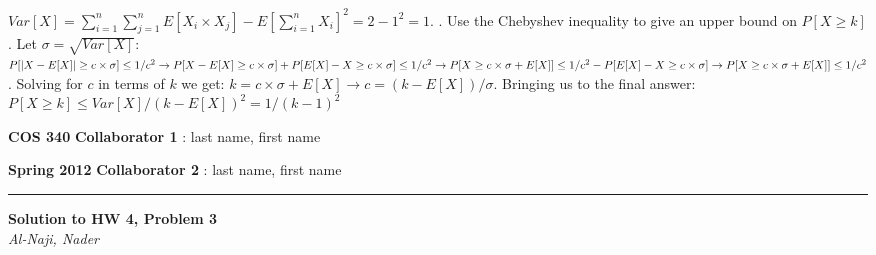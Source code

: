 \documentclass[12pt]{article}
\newcommand{\myheader}[4]
{\vspace*{-0.5in}
\noindent
{#1} \hfill {#3}

\noindent
{#2} \hfill {#4}

\noindent
\rule[8pt]{\textwidth}{1pt}

\vspace{1ex} 
}  %
\newcommand{\myalgsheader}[0]
{\myheader
{ {\bf{COS 340}} }
{ {\bf{Spring 2012}} }
{ {\bf{Collaborator 1}} : last name, first name }
{ {\bf{Collaborator 2}} : last name, first name}
}
\newcommand{\myhwtitle}[3]
{\begin{center}
{\large {\bf Solution to HW {#1}, Problem {#2}}}\\
\medskip 
{\it {#3}} %
\end{center}}
\begin{document}
\newline
$Var[X] = \sum\limits_{i=1}^{n} \sum\limits_{j=1}^{n} E[X_i \times X_j] - E[\sum\limits_{i=1}^{n} X_i]^2 = 2 - 1^2 = 1$.
\newline{}. Use the Chebyshev inequality to give an upper bound on $P[X \geq k]$.
\newline\newline
Let $\sigma = \sqrt{Var[X]}$:
\newline
$P[|X - E[X]| \geq c \times \sigma] \leq 1/c^2
\newline\newline
\rightarrow P[X - E[X] \geq c \times \sigma] + P[E[X] - X \geq c \times \sigma] \leq 1/c^2
\newline\newline
\rightarrow P[X \geq c \times \sigma + E[X]] \leq 1/c^2 - P[E[X] - X \geq c \times \sigma]
\newline\newline
\rightarrow P[X \geq c \times \sigma + E[X]] \leq 1/c^2$.
\newline\newline
Solving for $c$ in terms of $k$ we get:
\newline
$k = c \times \sigma + E[X] \rightarrow c = (k - E[X])/\sigma$.
\newline
\newline
Bringing us to the final answer:
\newline
$P[X \geq k] \leq Var[X]/(k - E[X])^2 = 1 / (k-1)^2$

\pagebreak

\myalgsheader

\pagestyle{plain}

\myhwtitle{4}{3}{Al-Naji, Nader}

\bigskip
\end{document}
